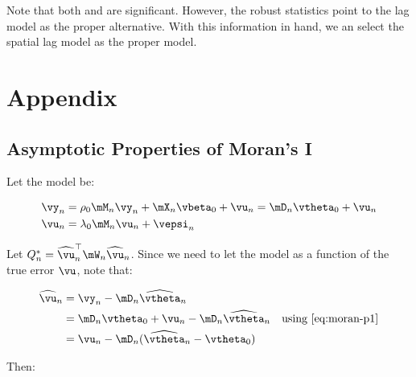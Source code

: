 \documentclass[english,12pt]{book}\usepackage[]{graphicx}\usepackage[]{xcolor}
\begin{document}
Note that both  and  are significant. However, the robust statistics point to the lag model as the proper alternative. With this information in hand, we an select the spatial lag model as the proper model. 

\section*{Appendix}


\begin{subappendices}

\section{Asymptotic Properties of Moran's I}


Let the model be:

\begin{equation}\label{eq:moran-p1}
\begin{aligned}
  \vy_n &= \rho_0\mM_n\vy_n + \mX_n\vbeta_0 + \vu_n  =  \mD_n\vtheta_0 + \vu_n \\
  \vu_n &= \lambda_0\mM_n\vu_n + \vepsi_n
\end{aligned}
\end{equation}

Let $Q_n^* = \widehat{\vu}_n^\top\mW_n\widehat{\vu}_n$. Since we need to let the model as a function of the true error $\vu$, note that:

\begin{equation}\label{eq:moran-p2}
\begin{aligned}
\widehat{\vu}_n & = \vy_n - \mD_n\widehat{\vtheta}_n \\
& = \mD_n\vtheta_0 + \vu_n -\mD_n\widehat{\vtheta}_n\quad\mbox{using \ref{eq:moran-p1}} \\
&= \vu_n - \mD_n(\widehat{\vtheta}_n - \vtheta_0)
\end{aligned}
\end{equation}

Then:


\end{subappendices}
\end{document}
